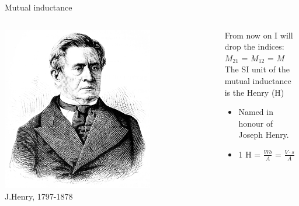 \begin{frame}{Mutual inductance}
\begin{columns}
  \begin{column}{0.20\textwidth}
    \begin{center}
       \includegraphics[width=0.70\textwidth]{./images/people/henry.jpg}\\
       {\tiny J.Henry, 1797-1878}
     \end{center}
  \end{column}
  \begin{column}{0.80\textwidth}
  {\small
        From now on I will drop the indices: $M_{21}$ = $M_{12}$ = {\color{magenta} $M$ }\\
        The SI unit of the mutual inductance is the {Henry} (H)
        \begin{itemize}
              \item Named in honour of Joseph Henry.
              \item 1 H = $\displaystyle \frac{Wb}{A}$ = $\displaystyle \frac{V \cdot s}{A}$
        \end{itemize}
  }
  \end{column}
\end{columns}


\end{frame}

%
%
%

